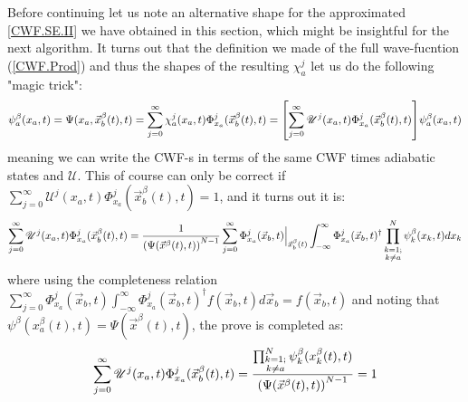 \documentclass[11pt, a4paper]{article} %
\newcommand{\U}{\mathscr{U}}
\begin{document}
Before continuing let us note an alternative shape for the approximated \ref{CWF.SE.II} we have obtained in this section, which might be insightful for the next algorithm. It turns out that the definition we made of the full wave-fucntion (\ref{CWF.Prod}) and thus the shapes of the resulting  $\chi^j_a$ let us do the following "magic trick":
$$
\psi^\beta_a(x_a,t)=\Psi(x_a,\vec{x}_b^\beta(t),t)=\sum_{j=0}^\infty \chi^j_a(x_a,t)\Phi^j_{x_a}(\vec{x}_b^\beta(t),t)=\qty[ \sum_{j=0}^\infty\U^j(x_a,t)\Phi^j_{x_a}(\vec{x}_b^\beta(t),t)]\psi^\beta_a(x_a,t)
$$
meaning we can write the CWF-s in terms of the same CWF times adiabatic states and $\U$. This of course can only be correct if $\sum_{j=0}^\infty\U^j(x_a,t)\Phi^j_{x_a}(\vec{x}_b^\beta(t),t)=1$, and it turns out it is:
$$
\sum_{j=0}^\infty\U^j(x_a,t)\Phi^j_{x_a}(\vec{x}_b^\beta(t),t) = \frac{1}{ \qty(\Psi(\vec{x}^\beta(t),t))^{N-1}} \sum_{j=0}^\infty \Phi^j_{x_a}(\vec{x}_b,t)\Big\rvert_{\vec{x}_b^\beta(t)}\int_{-\infty}^\infty \Phi_{x_a}^j(\vec{x}_b,t)^\dagger \prod_{\substack{k=1; \\ k\neq a}}^{N}\psi^\beta_k(x_k,t) dx_k 
$$
where using the completeness relation $\sum_{j=0}^\infty \Phi^j_{x_a}(\vec{x}_b,t)\int_{-\infty}^\infty \Phi_{x_a}^j(\vec{x}_b,t)^\dagger f(\vec{x}_b,t)d\vec{x}_b = f(\vec{x}_b,t)$ and noting that $\psi^\beta(x_a^\beta(t),t)=\Psi(\vec{x}^\beta(t),t)$, the prove is completed as:
$$
\sum_{j=0}^\infty\U^j(x_a,t)\Phi^j_{x_a}(\vec{x}_b^\beta(t),t)=\frac{ \prod_{\substack{k=1; \\ k\neq a}}^{N}\psi^\beta_k(x_k^\beta(t),t)}{ \qty(\Psi(\vec{x}^\beta(t),t))^{N-1}}=1
$$
\end{document}
